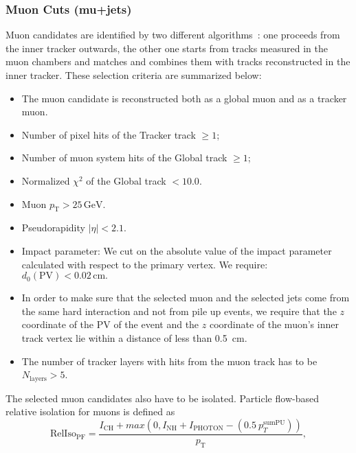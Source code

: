 
\subsubsection{Muon Cuts (mu+jets)}
\label{sec:muon_cuts}

Muon candidates are identified by two different 
algorithms~\cite{MUONPAS}: one proceeds from the inner tracker outwards, 
the other one starts from tracks measured in the muon chambers and matches 
and combines them with tracks reconstructed in the inner tracker. 
These selection criteria are summarized below:
\begin{itemize}
\item The muon candidate is reconstructed both as a global muon and
as a tracker muon.
\item Number of pixel hits of the Tracker track $\ge 1$;
\item Number of muon system hits of the Global track $\ge 1$;
\item Normalized $\chi^{2}$ of the Global track $< 10.0$.
\item Muon $p_{\mathrm{T}} > 25\,\mathrm{GeV}$.
\item Pseudorapidity $|\eta| < 2.1$.
\item Impact parameter: We cut on the absolute value of the impact
parameter calculated with respect to the primary vertex. We require:
$d_0(\mathrm{PV}) < 0.02\,\mathrm{cm}.$
\item In order to make sure that the selected muon and the selected
jets come from the same hard interaction and not from pile up events,
we require that the $z$ coordinate of the PV of the event and the $z$
coordinate of the muon's inner track vertex lie within a distance of
less than 0.5~cm.
\item The number of tracker layers with hits from the muon track has to be
$N_{\mathrm{layers}} > 5$.
\end{itemize}

The selected muon candidates also have to be isolated. Particle
flow-based relative isolation for muons is defined as
\begin{equation*}
\mathrm{RelIso_{\mathrm{PF}}} = \frac{I_{\mathrm{CH}}+max(0,I_{\mathrm{NH}}+I_{\mathrm{PHOTON}}-(0.5~{p}_{T}^\mathrm{sumPU}))}{p_\mathrm{T}},
\end{equation*} 


